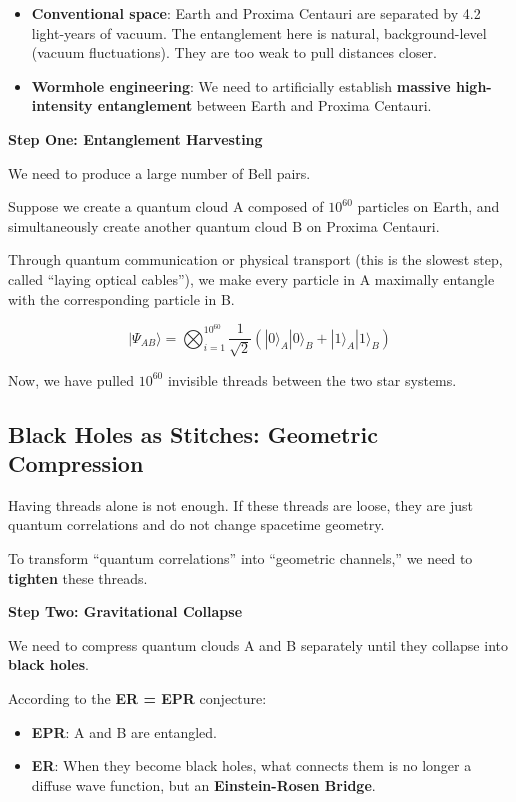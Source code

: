\begin{itemize}
\item \textbf{Conventional space}: Earth and Proxima Centauri are separated by 4.2 light-years of vacuum. The entanglement here is natural, background-level (vacuum fluctuations). They are too weak to pull distances closer.

\item \textbf{Wormhole engineering}: We need to artificially establish \textbf{massive high-intensity entanglement} between Earth and Proxima Centauri.
\end{itemize}

\textbf{Step One: Entanglement Harvesting}

We need to produce a large number of Bell pairs.

Suppose we create a quantum cloud A composed of $10^{60}$ particles on Earth, and simultaneously create another quantum cloud B on Proxima Centauri.

Through quantum communication or physical transport (this is the slowest step, called ``laying optical cables''), we make every particle in A maximally entangle with the corresponding particle in B.

\[|\Psi_{AB}\rangle = \bigotimes_{i=1}^{10^{60}} \frac{1}{\sqrt{2}} (|0\rangle_A|0\rangle_B + |1\rangle_A|1\rangle_B)\]

Now, we have pulled $10^{60}$ invisible threads between the two star systems.

\subsection{Black Holes as Stitches: Geometric Compression}

Having threads alone is not enough. If these threads are loose, they are just quantum correlations and do not change spacetime geometry.

To transform ``quantum correlations'' into ``geometric channels,'' we need to \textbf{tighten} these threads.

\textbf{Step Two: Gravitational Collapse}

We need to compress quantum clouds A and B separately until they collapse into \textbf{black holes}.

According to the \textbf{ER = EPR} conjecture:

\begin{itemize}
\item \textbf{EPR}: A and B are entangled.

\item \textbf{ER}: When they become black holes, what connects them is no longer a diffuse wave function, but an \textbf{Einstein-Rosen Bridge}.
\end{itemize}

